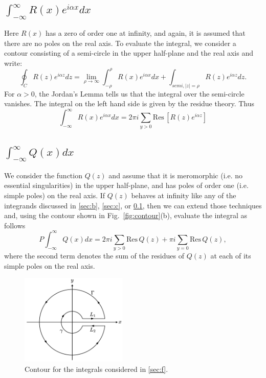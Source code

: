 \documentclass[11pt, letterpaper]{article}
\begin{document}
\subsection{$\displaystyle\int_{-\infty}^{\infty}R(x)e^{i\alpha x}dx$}
\label{sec:d}
Here $R(x)$ has a zero of order one at infinity, and again, it is assumed that there are no poles on the real axis.
To evaluate the integral, we consider a contour consisting of a semi-circle in the upper half-plane and the real axis
and write:
\begin{equation}
	\oint_C R(z) e^{i\alpha z}dz = \lim_{\rho\rightarrow\infty}\int_{-\rho}^\rho R(x)e^{i\alpha x}dx +
								   \int_{semi, |z|=\rho}R(z)e^{i\alpha z}dz.
\end{equation}
For $\alpha > 0$, the Jordan's Lemma tells us that the integral over the semi-circle vanishes. The integral on the
left hand side is given by the residue theory. Thus
\begin{equation}
	\int_{-\infty}^{\infty}R(x)e^{i\alpha x}dx = 2\pi i\sum_{y>0}\mbox{Res}\,\left[ R(z)e^{i\alpha z}\right]
\end{equation}


\subsection{$\displaystyle\int_{-\infty}^{\infty}Q(x)dx$}
\label{sec:e}
We consider the function $Q(z)$ and assume that it is meromorphic (i.e. no essential singularities) in the upper half-plane,
and has poles of order one (i.e. simple poles) on the real axis. If $Q(z)$ behaves at infinity like any of the integrands
discussed in \ref{sec:b}, \ref{sec:c}, or \ref{sec:d}, then we can extend those techniques and, using the contour shown
in Fig.~\ref{fig:contour}(b), evaluate the integral as follows
\begin{equation}
P\int_{-\infty}^{\infty}Q(x)dx = 2\pi i\sum_{y>0}\mbox{Res}\,Q(z) + \pi i\sum_{y=0}\mbox{Res}\,Q(z),
\end{equation}
where the second term denotes the sum of the residues of $Q(z)$ at each of its simple poles on the real axis.


\begin{figure}
\includegraphics[width=0.45\textwidth]{./figures/fig_complex_analysis2.pdf}
\caption{Contour for the integrals considered in \ref{sec:f}.}
\label{fig:contour2}
\end{figure}
\end{document}
